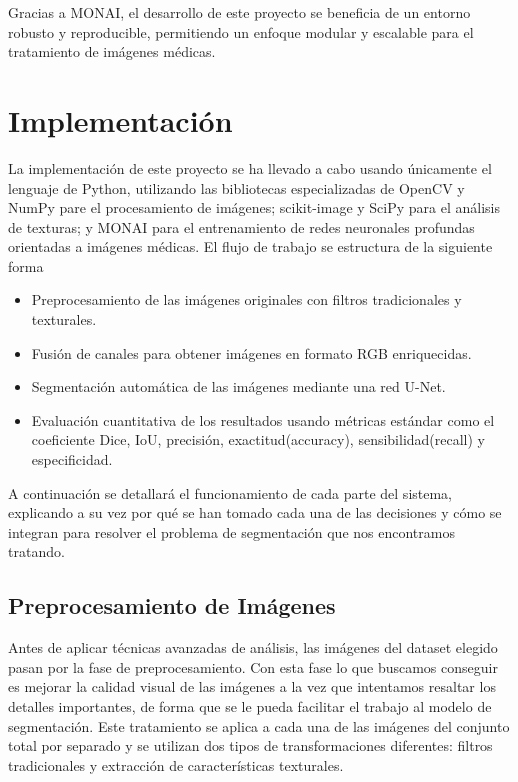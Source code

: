 \documentclass[12pt]{article}
\begin{document}
Gracias a MONAI, el desarrollo de este proyecto se beneficia de un entorno robusto y reproducible, permitiendo un enfoque modular y escalable para el tratamiento de imágenes médicas.


\section{Implementación}

La implementación de este proyecto se ha llevado a cabo usando únicamente el lenguaje de Python, utilizando las bibliotecas especializadas de OpenCV y NumPy pare el procesamiento de imágenes; scikit-image y SciPy para el análisis de texturas; y MONAI para el entrenamiento de redes neuronales profundas orientadas a imágenes médicas.
El flujo de trabajo se estructura de la siguiente forma
\begin{itemize}
    \item Preprocesamiento de las imágenes originales con filtros tradicionales y texturales.
    \item Fusión de canales para obtener imágenes en formato RGB enriquecidas.
    \item Segmentación automática de las imágenes mediante una red U-Net.
    \item Evaluación cuantitativa de los resultados usando métricas estándar como el coeficiente Dice, IoU, precisión, exactitud(accuracy), sensibilidad(recall) y especificidad.
\end{itemize}

A continuación se detallará el funcionamiento de cada parte del sistema, explicando a su vez  por qué se han tomado cada una de las decisiones y cómo se integran para resolver el problema de segmentación que nos encontramos tratando.

\subsection{Preprocesamiento de Imágenes}
Antes de aplicar técnicas avanzadas de análisis, las imágenes del dataset elegido pasan por la fase de preprocesamiento. Con esta fase lo que buscamos conseguir es mejorar la calidad visual de las imágenes a la vez que intentamos resaltar los detalles importantes, de forma que se le pueda facilitar el trabajo al modelo de segmentación. Este tratamiento se aplica a cada una de las imágenes del conjunto total por separado y se utilizan dos tipos de transformaciones diferentes: filtros tradicionales y extracción de características texturales. 
\end{document}
